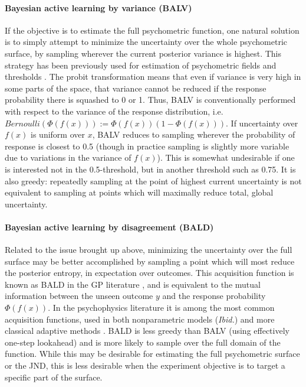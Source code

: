\documentclass[../main.tex]{subfiles}
\begin{document}
\paragraph{Bayesian active learning by variance (BALV)}
If the objective is to estimate the full psychometric function, one natural solution is to simply attempt to minimize the uncertainty over the whole psychometric surface, by sampling wherever the current posterior variance is highest. This strategy has been previously used for estimation of psychometric fields and thresholds \citep{Song2018,Song2017b,Gardner2015a,Schlittenlacher2018,Schlittenlacher2020}. The probit transformation means that even if variance is very high in some parts of the space, that variance cannot be reduced if the response probability there is squashed to 0 or 1. Thus, BALV is conventionally performed with respect to the variance of the response distribution, i.e.\ $Bernoulli(\Phi(f(x))):=\Phi(f(x))(1-\Phi(f(x)))$. If uncertainty over $f(x)$ is uniform over $x$, BALV reduces to sampling wherever the probability of response is closest to 0.5 (though in practice sampling is slightly more variable due to variations in the variance of $f(x)$). This is somewhat undesirable if one is interested not in the 0.5-threshold, but in another threshold such as 0.75. It is also greedy: repeatedly sampling at the point of highest current uncertainty is not equivalent to sampling at points which will maximally reduce total, global uncertainty.

\paragraph{Bayesian active learning by disagreement (BALD)}
Related to the issue brought up above, minimizing the uncertainty over the full surface may be better accomplished by sampling a point which will most reduce the posterior entropy, in expectation over outcomes. This acquisition function is known as BALD in the GP literature \citep[e.g.][]{Houlsby2011}, and is equivalent to the mutual information between the unseen outcome $y$  and the response probability $\Phi(f(x))$. In the psychophysics literature it is among the most common acquisition functions, used in both nonparametric models (\emph{Ibid.}) and more classical adaptive methods \citep[e.g.][]{Watson2017,Kontsevich1999,Brand2002,DiMattina2015,Hall1981,Watson1983,Kujala2006,Lesmes2010}. BALD is less greedy than BALV (using effectively one-step lookahead) and is more likely to sample over the full domain of the function. While this may be desirable for estimating the full psychometric surface or the JND, this is less desirable when the experiment objective is to target a specific part of the surface.
\end{document}
